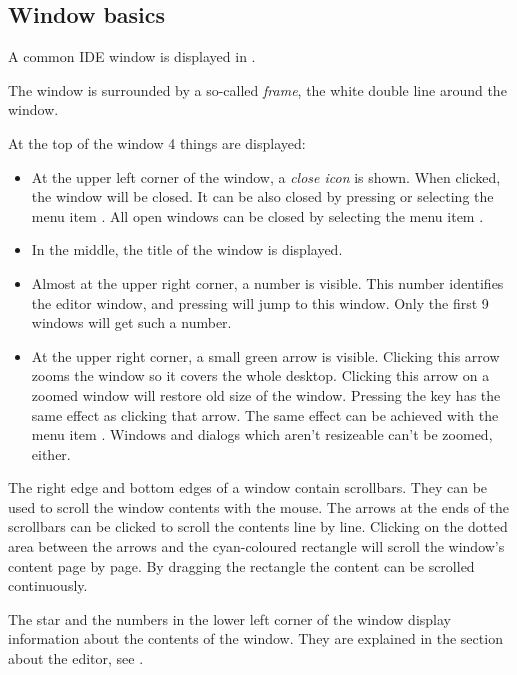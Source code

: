 \subsection{Window basics}
\label{se:windowbasics}

A common IDE window is displayed in .


The window is surrounded by a so-called \emph{frame}, the white double
line around the window. 

At the top of the window 4 things are displayed:
\begin{itemize}
\item 
At the upper left corner of the window, a \emph{close icon} is shown. 
When clicked, the window will be closed. It can be also closed by
 pressing  or selecting the menu item . 
All open windows can be closed by selecting the menu item 
.
\item In the middle, the title of the window is displayed.
\item Almost at the upper right corner, a number is visible.
This number identifies the editor window, and pressing 
will jump to this window. Only the first 9 windows will get such a number.
\item At the upper right corner, a small green arrow is visible.
Clicking this arrow zooms the window so it covers the whole desktop. 
Clicking this arrow on a zoomed window will restore old size of the 
window. Pressing the key  has the same effect as clicking 
that arrow. The same effect can be achieved with the menu item 
. 
Windows and dialogs which aren't resizeable can't be zoomed, either.
\end{itemize}

The right edge and bottom edges of a window contain scrollbars.
They can be used to scroll the window contents with the mouse. 
The arrows at the ends of the scrollbars can be clicked to scroll the 
contents line by line. Clicking on the dotted area between the arrows 
and the cyan-coloured rectangle will scroll the window's content 
page by page. By dragging the rectangle the content can be scrolled 
continuously.

The star and the numbers in the lower left corner of the window
display information about the contents of the window. They
are explained in the section about the editor, see .

